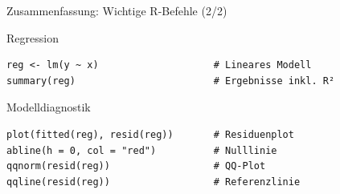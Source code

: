 \documentclass[aspectratio=169,11pt]{beamer}
\begin{document}
\begin{frame}[fragile]{Zusammenfassung: Wichtige R-Befehle (2/2)}
  \begin{block}{Regression}
    \begin{lstlisting}
reg <- lm(y ~ x)                    # Lineares Modell
summary(reg)                        # Ergebnisse inkl. R²
\end{lstlisting}
  \end{block}

  \vspace{0.3cm}

  \begin{block}{Modelldiagnostik}
    \begin{lstlisting}
plot(fitted(reg), resid(reg))       # Residuenplot
abline(h = 0, col = "red")          # Nulllinie
qqnorm(resid(reg))                  # QQ-Plot
qqline(resid(reg))                  # Referenzlinie
\end{lstlisting}
  \end{block}
\end{frame}
\end{document}
